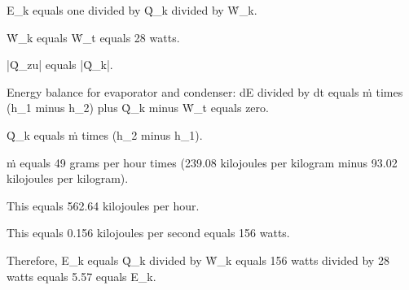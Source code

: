 E_k equals one divided by Q̇_k divided by Ẇ_k.  

Ẇ_k equals Ẇ_t equals 28 watts.  

|Q̇_zu| equals |Q̇_k|.  

Energy balance for evaporator and condenser:  
dE divided by dt equals ṁ times (h_1 minus h_2) plus Q̇_k minus Ẇ_t equals zero.  

Q̇_k equals ṁ times (h_2 minus h_1).  

ṁ equals 49 grams per hour times (239.08 kilojoules per kilogram minus 93.02 kilojoules per kilogram).  

This equals 562.64 kilojoules per hour.  

This equals 0.156 kilojoules per second equals 156 watts.  

Therefore, E_k equals Q̇_k divided by Ẇ_k equals 156 watts divided by 28 watts equals 5.57 equals E_k.